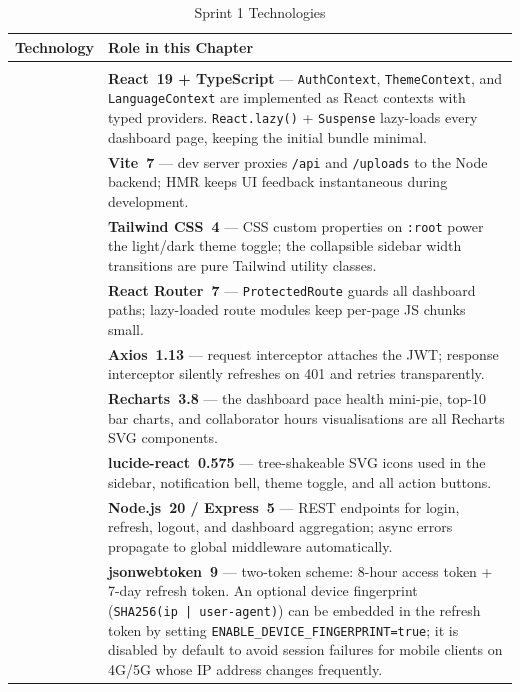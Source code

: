 \documentclass[12pt,a4paper]{report}
\newcommand{\logoplace}[1]{%
  \begin{tikzpicture}[baseline=-0.5ex]
    \node[fill=logobg, draw=logoborder, rounded corners=4pt,
          inner xsep=6pt, inner ysep=4pt,
          minimum width=2.4cm, minimum height=0.75cm,
          font=\bfseries\footnotesize\color{accentgray}] {#1};
  \end{tikzpicture}%
}
\newenvironment{techtable}[2]{%
  \begin{longtable}{>{\centering\arraybackslash}p{2.6cm} p{11cm}}
  \caption{#1}\label{#2}\\
  \toprule\textbf{Technology} & \textbf{Role in this Chapter}\\\midrule\endhead
  \midrule\multicolumn{2}{r}{\small\itshape Continued\ldots}\\\endfoot
  \bottomrule\endlastfoot
}{%
  \end{longtable}%
}
\begin{document}
\begin{techtable}{Sprint 1 Technologies}{tab:tech-sprint1}

  \logoplace{React 19} &
  \textbf{React~19 + TypeScript} --- \texttt{AuthContext}, \texttt{ThemeContext},
  and \texttt{LanguageContext} are implemented as React contexts with typed providers.
  \texttt{React.lazy()} + \texttt{Suspense} lazy-loads every dashboard page, keeping
  the initial bundle minimal.\\[6pt]

  \logoplace{Vite 7} &
  \textbf{Vite~7} --- dev server proxies \texttt{/api} and \texttt{/uploads} to the
  Node backend; HMR keeps UI feedback instantaneous during development.\\[6pt]

  \logoplace{Tailwind 4} &
  \textbf{Tailwind CSS~4} --- CSS custom properties on \texttt{:root} power the
  light/dark theme toggle; the collapsible sidebar width transitions are pure
  Tailwind utility classes.\\[6pt]

  \logoplace{React Router 7} &
  \textbf{React Router~7} --- \texttt{ProtectedRoute} guards all dashboard paths;
  lazy-loaded route modules keep per-page JS chunks small.\\[6pt]

  \logoplace{Axios 1.13} &
  \textbf{Axios~1.13} --- request interceptor attaches the JWT; response interceptor
  silently refreshes on 401 and retries transparently.\\[6pt]

  \logoplace{Recharts 3.8} &
  \textbf{Recharts~3.8} --- the dashboard pace health mini-pie, top-10 bar charts,
  and collaborator hours visualisations are all Recharts SVG components.\\[6pt]

  \logoplace{lucide-react} &
  \textbf{lucide-react~0.575} --- tree-shakeable SVG icons used in the sidebar,
  notification bell, theme toggle, and all action buttons.\\[6pt]

  \logoplace{Node.js 20} &
  \textbf{Node.js~20 / Express~5} --- REST endpoints for login, refresh, logout,
  and dashboard aggregation; async errors propagate to global middleware automatically.\\[6pt]

  \logoplace{JWT} &
  \textbf{jsonwebtoken~9} --- two-token scheme: 8-hour access token + 7-day refresh
  token. An optional device fingerprint (\texttt{SHA256(ip\,|\,user-agent)}) can be
  embedded in the refresh token by setting \texttt{ENABLE\_DEVICE\_FINGERPRINT=true};
  it is disabled by default to avoid session failures for mobile clients on 4G/5G
  whose IP address changes frequently.\\[6pt]


\end{techtable}
\end{document}
